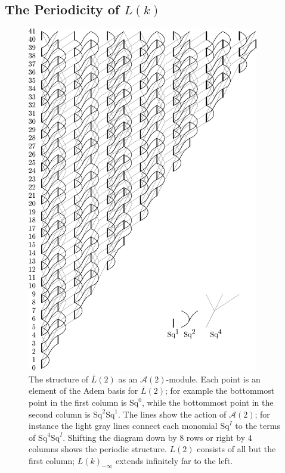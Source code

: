 \documentclass{article}
\newcommand{\A}{\mathcal{A}}
\newcommand{\Sq}{\mathrm{Sq}}
\renewcommand{\L}{\bar{L}}
\newcommand{\Lkm}[1][k]{L{(#1)}_{-\infty}}
\begin{document}
\subsection{The Periodicity of \boldmath$L(k)$}

\begin{figure}
  \includegraphics[width=0.9\textwidth]{pics/L2-paper.pdf}
  \caption{The structure of $\L(2)$ as an $\A(2)$-module.  Each point is an element of the Adem basis for $\L(2)$; for example the bottommost point in the first column is $\Sq^0$, while the bottommost point in the second column is $\Sq^2\Sq^1$.  The lines show the action of $\A(2)$; for instance the light gray lines connect each monomial $\Sq^I$ to the terms of $\Sq^4\Sq^I$.  Shifting the diagram down by 8 rows or right by 4 columns shows the periodic structure.  $L(2)$ consists of all but the first column; $\Lkm$ extends infinitely far to the left.\label{fig:L2}}
\end{figure}
\end{document}
